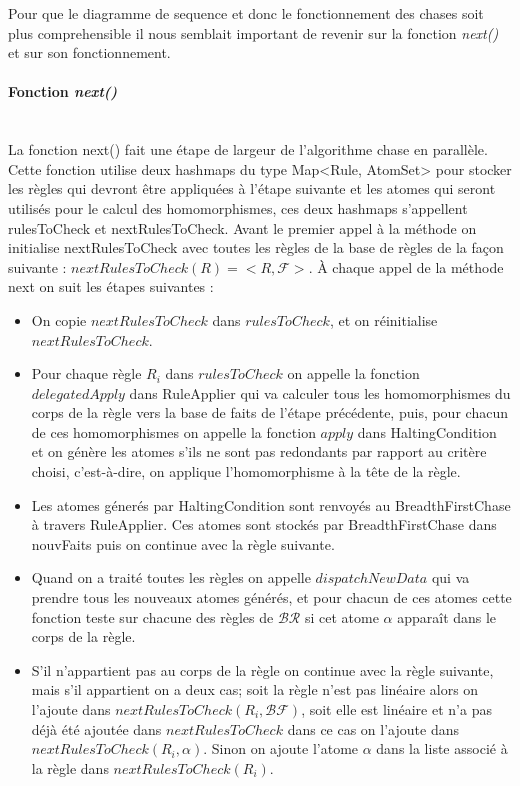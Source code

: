         Pour que le diagramme de sequence et donc le fonctionnement des chases soit plus comprehensible il nous semblait important de revenir sur la fonction \textit{next()} et sur son fonctionnement.
        
        \paragraph{Fonction \textit{next()}}\ \\
        La fonction next() fait une étape de largeur de l'algorithme chase en parallèle. Cette fonction utilise deux hashmaps du type Map<Rule, AtomSet> pour stocker les règles qui devront être appliquées à l'étape suivante et les atomes qui seront utilisés pour le calcul des homomorphismes, ces deux hashmaps s'appellent rulesToCheck et nextRulesToCheck. Avant le premier appel à la méthode on initialise nextRulesToCheck avec toutes les règles de la base de règles de la façon suivante : $nextRulesToCheck({R}) = <{R},\mathcal{F}> $. À chaque appel de la méthode next on suit les étapes suivantes : 
        \\
        
        \begin{itemize}
        \item On copie $nextRulesToCheck$ dans $rulesToCheck$, et on réinitialise $nextRulesToCheck$.
        \item Pour chaque règle $R_i$ dans $rulesToCheck$ on appelle la fonction $delegatedApply$ dans RuleApplier qui va calculer tous les homomorphismes du corps de la règle vers la base de faits de l'étape précédente, puis, pour chacun de ces homomorphismes on appelle la fonction $apply$ dans HaltingCondition et on génère les atomes s'ils ne sont pas redondants par rapport au critère choisi, c'est-à-dire, on applique l'homomorphisme à la tête de la règle.
        \item Les atomes génerés par HaltingCondition sont renvoyés au BreadthFirstChase à travers RuleApplier. Ces atomes sont stockés par BreadthFirstChase dans nouvFaits puis on continue avec la règle suivante.
        \item Quand on a traité toutes les règles on appelle $dispatchNewData$ qui va prendre tous les nouveaux atomes générés, et pour chacun de ces atomes cette fonction teste sur chacune des règles de $\mathcal{BR}$ si cet atome $\alpha$ apparaît dans le corps de la règle. 
        \item S'il n'appartient pas au corps de la règle on continue avec la règle suivante, mais s'il appartient on a deux cas; soit la règle n'est pas linéaire alors on l'ajoute dans $nextRulesToCheck(R_i,\mathcal{BF})$, soit elle est linéaire et n'a pas déjà été ajoutée dans $nextRulesToCheck$ dans ce cas on l'ajoute dans $nextRulesToCheck(R_i, \alpha)$. Sinon on ajoute l'atome $\alpha$ dans la liste associé à la règle dans $nextRulesToCheck(R_i)$. 
        \end{itemize}
        
